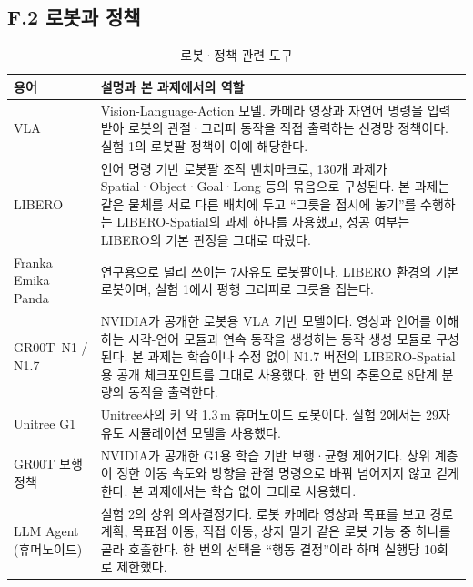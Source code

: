 \subsection*{F.2 로봇과 정책}
\begin{table}[H]
\centering\small
\caption{로봇·정책 관련 도구}
\begin{tabularx}{\linewidth}{@{}p{30mm}Y@{}}
\toprule
용어 & 설명과 본 과제에서의 역할 \\
\midrule
VLA~\cite{rt2} & Vision-Language-Action 모델. 카메라 영상과 자연어 명령을 입력받아 로봇의 관절·그리퍼 동작을 직접 출력하는 신경망 정책이다. 실험 1의 로봇팔 정책이 이에 해당한다. \\
LIBERO~\cite{libero} & 언어 명령 기반 로봇팔 조작 벤치마크로, 130개 과제가 Spatial·Object·Goal·Long 등의 묶음으로 구성된다. 본 과제는 같은 물체를 서로 다른 배치에 두고 ``그릇을 접시에 놓기''를 수행하는 LIBERO-Spatial의 과제 하나를 사용했고, 성공 여부는 LIBERO의 기본 판정을 그대로 따랐다. \\
Franka Emika Panda~\cite{panda} & 연구용으로 널리 쓰이는 7자유도 로봇팔이다. LIBERO 환경의 기본 로봇이며, 실험 1에서 평행 그리퍼로 그릇을 집는다. \\
GR00T~N1 / N1.7~\cite{groot,grootrepo} & NVIDIA가 공개한 로봇용 VLA 기반 모델이다. 영상과 언어를 이해하는 시각-언어 모듈과 연속 동작을 생성하는 동작 생성 모듈로 구성된다. 본 과제는 학습이나 수정 없이 N1.7 버전의 LIBERO-Spatial용 공개 체크포인트를 그대로 사용했다. 한 번의 추론으로 8단계 분량의 동작을 출력한다. \\
Unitree G1~\cite{g1} & Unitree사의 키 약 1.3\,m 휴머노이드 로봇이다. 실험 2에서는 29자유도 시뮬레이션 모델을 사용했다. \\
GR00T 보행 정책~\cite{wbc} & NVIDIA가 공개한 G1용 학습 기반 보행·균형 제어기다. 상위 계층이 정한 이동 속도와 방향을 관절 명령으로 바꿔 넘어지지 않고 걷게 한다. 본 과제에서는 학습 없이 그대로 사용했다. \\
LLM Agent (휴머노이드) & 실험 2의 상위 의사결정기다. 로봇 카메라 영상과 목표를 보고 경로 계획, 목표점 이동, 직접 이동, 상자 밀기 같은 로봇 기능 중 하나를 골라 호출한다. 한 번의 선택을 ``행동 결정''이라 하며 실행당 10회로 제한했다. \\
\bottomrule
\end{tabularx}
\end{table}


